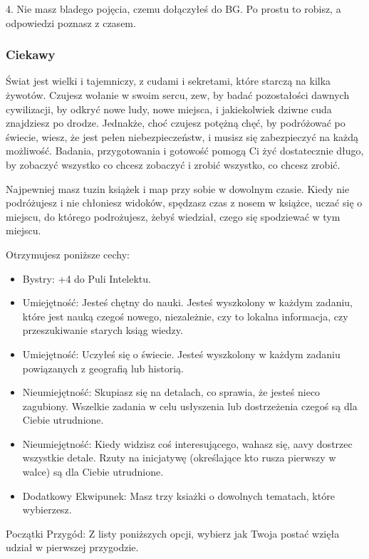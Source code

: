 4. Nie masz bladego pojęcia, czemu dołączyłeś do BG. Po prostu to robisz, a odpowiedzi poznasz z czasem.

\subsubsection{Ciekawy}

Świat jest wielki i tajemniczy, z cudami i sekretami, które starczą na kilka żywotów. Czujesz wołanie w swoim sercu, zew, by badać pozostałości dawnych cywilizacji, by odkryć nowe ludy, nowe miejsca, i jakiekolwiek dziwne cuda znajdziesz po drodze. Jednakże, choć czujesz potężną chęć, by podróżować po świecie, wiesz, że jest pełen niebezpieczeństw, i musisz się zabezpieczyć na każdą możliwość. Badania, przygotowania i gotowość pomogą Ci żyć dostatecznie długo, by zobaczyć wszystko co chcesz zobaczyć i zrobić wszystko, co chcesz zrobić.

Najpewniej masz tuzin książek i map przy sobie w dowolnym czasie. Kiedy nie podróżujesz i nie chłoniesz widoków, spędzasz czas z nosem w książce, uczać się o miejscu, do którego podrożujesz, żebyś wiedział, czego się spodziewać w tym miejscu.

Otrzymujesz poniższe cechy:
\begin{itemize}
\item  Bystry: +4 do Puli Intelektu.
\item Umiejętność: Jesteś chętny do nauki. Jesteś wyszkolony w każdym zadaniu, które jest nauką czegoś nowego, niezależnie, czy to lokalna informacja, czy przeszukiwanie starych ksiąg wiedzy.
\item  Umiejętność: Uczyłeś się o świecie. Jesteś wyszkolony w każdym zadaniu powiązanych z geografią lub historią.
\item Nieumiejętność: Skupiasz się na detalach, co sprawia, że jesteś nieco zagubiony. Wszelkie zadania w celu usłyszenia lub dostrzeżenia czegoś są dla Ciebie utrudnione.
\item Nieumiejętność: Kiedy widzisz coś interesującego, wahasz się, aavy dostrzec wszystkie detale. Rzuty na inicjatywę (określające kto rusza pierwszy w walce) są dla Ciebie utrudnione.
\item Dodatkowy Ekwipunek: Masz trzy ksiażki o dowolnych tematach, które wybierzesz.
\end{itemize}

Początki Przygód: Z listy poniższych opcji, wybierz jak Twoja postać wzięła udział w pierwszej przygodzie.

